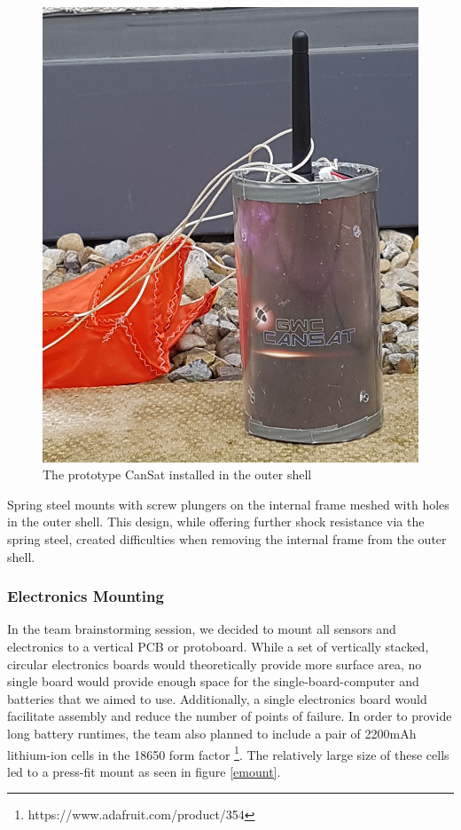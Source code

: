 \documentclass[]{report}
\begin{document}
	 	\begin{figure}[h]
	 		\hfill\includegraphics[scale=0.1]{cansat-shell.jpg}\hspace*{\fill}
	 		\caption{The prototype CanSat installed in the outer shell}
	 		\label{cshell}
	 	\end{figure}
	 	
	 	
	 	Spring steel mounts with screw plungers on the internal frame meshed with holes in the outer shell. This design, while offering further shock resistance via the spring steel, created difficulties when removing the internal frame from the outer shell.
	 	\subsubsection{Electronics Mounting}
	 	In the team brainstorming session, we decided to mount all sensors and electronics to a vertical PCB or protoboard. While a set of vertically stacked, circular electronics boards would theoretically provide more surface area, no single board would provide enough space for the single-board-computer and batteries that we aimed to use. Additionally, a single electronics board would facilitate assembly and reduce the number of points of failure. In order to provide long battery runtimes, the team also planned to include a pair of 2200mAh lithium-ion cells in the 18650 form factor \footnote{https://www.adafruit.com/product/354}. The relatively large size of these cells led to a press-fit mount as seen in figure \ref{emount}.
	 	
\end{document}
